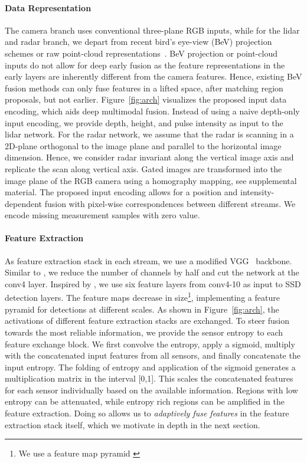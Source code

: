 \paragraph{Data Representation}\label{sec:datarep} The camera branch uses conventional three-plane RGB inputs, while for the lidar and radar branch, we depart from recent bird's eye-view (BeV) projection~\cite{ku2018joint} schemes or raw point-cloud representations~\cite{xu2017pointfusion}. BeV projection or point-cloud inputs do not allow for deep early fusion as the feature representations in the early layers are inherently different from the camera features. Hence, existing BeV fusion methods can only fuse features in a lifted space, after matching region proposals, but not earlier. Figure~\ref{fig:arch} visualizes the proposed input data encoding, which aids deep multimodal fusion. 
Instead of using a naive depth-only input encoding, we provide depth, height, and pulse intensity as input to the lidar network. 
For the radar network, we assume that the radar is scanning in a 2D-plane orthogonal to the image plane and parallel to the horizontal image dimension. Hence, we consider radar invariant along the vertical image axis and replicate the scan along vertical axis. Gated images are transformed into the image plane of the RGB camera using a homography mapping, see supplemental material. The proposed input encoding allows for a position and intensity-dependent fusion with pixel-wise correspondences between different streams. We encode missing measurement samples with zero value.

\vspace{-0.5em}
\paragraph{Feature Extraction} As feature extraction stack in each stream, we use a modified VGG~\cite{simonyan2014very} backbone. Similar to \cite{ku2018joint,chen2017multi}, we reduce the number of channels by half and cut the network at the conv4 layer. Inspired by \cite{SSDLiu2015,featurePyramid}, we use six feature layers from conv4-10 as input to SSD detection layers. The feature maps decrease in size\footnote{\tiny{We use a feature map pyramid }}, implementing a feature pyramid for detections at different scales. As shown in Figure~\ref{fig:arch}, the activations of different feature extraction stacks are exchanged. To steer fusion towards the most reliable information, we provide the sensor entropy to each feature exchange block. We first convolve the entropy, apply a sigmoid, multiply with the concatenated input features from all sensors, and finally concatenate the input entropy. The folding of entropy and application of the sigmoid generates a multiplication matrix in the interval [0,1]. This scales the concatenated features for each sensor individually based on the available information. Regions with low entropy can be attenuated, while entropy rich regions can be amplified in the feature extraction. Doing so allows us to \emph{adaptively fuse features} in the feature extraction stack itself, which we motivate in depth in the next section. 

